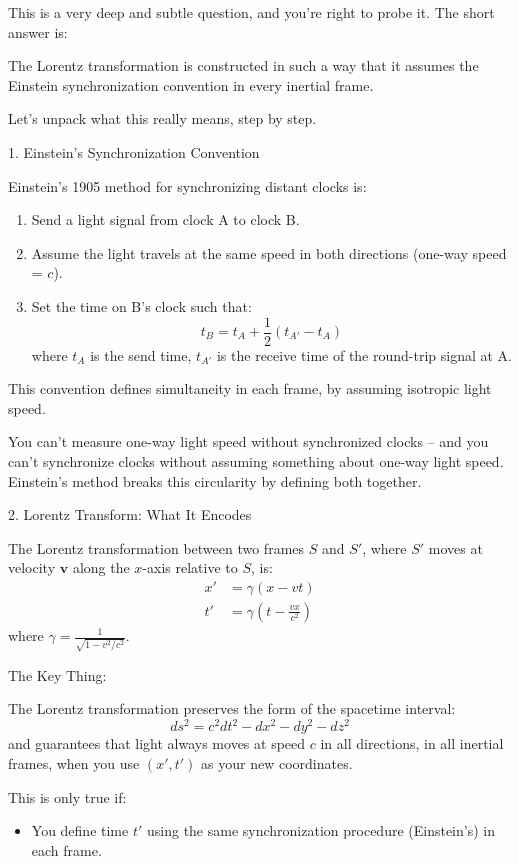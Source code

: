 \documentclass[a4paper]{article}
\theoremstyle{plain}
\theoremstyle{definition}
\newcommand{\vect}[1]{\mathbf{#1}}
\begin{document}
This is a very deep and subtle question, and you're right to probe it.
The short answer is:

The Lorentz transformation is constructed in such a way that it
assumes the Einstein synchronization convention in every inertial
frame.

Let's unpack what this really means, step by step.

1. Einstein's Synchronization Convention

Einstein's 1905 method for synchronizing distant clocks is:
\begin{enumerate}
\item Send a light signal from clock A to clock B.
\item Assume the light travels at the same speed in both directions
  (one-way speed = $c$).
\item Set the time on B’s clock such that:
  \begin{equation}
  t_B = t_A + \frac{1}{2} (t_{A'} - t_A)
  \end{equation}
  where $t_A$ is the send time, $t_{A'}$ is the receive time of the
round-trip signal at A.
\end{enumerate}
This convention defines simultaneity in each frame, by assuming
isotropic light speed.

You can't measure one-way light speed without synchronized clocks --
and you can't synchronize clocks without assuming something about
one-way light speed.  Einstein's method breaks this circularity by
defining both together.

2. Lorentz Transform: What It Encodes

The Lorentz transformation between two frames $S$ and $S'$, where $S'$
moves at velocity $\vect{v}$ along the $x$-axis relative to $S$, is:
\begin{align*}
x' & = \gamma (x - vt) \\
t' & = \gamma (t - \frac{vx}{c^2})
\end{align*}
where $\gamma = \frac{1}{\sqrt{1 - v^2/c^2}}$.

The Key Thing:

The Lorentz transformation preserves the form of the spacetime
interval:
\begin{equation}
ds^2 = c^2dt^2 - dx^2 - dy^2 - dz^2
\end{equation}
and guarantees that light always moves at speed $c$ in all directions,
in all inertial frames, when you use $(x', t')$ as your new
coordinates.

This is only true if:
\begin{itemize}
\item You define time $t'$ using the same synchronization procedure
  (Einstein's) in each frame.
\end{itemize}
\end{document}
